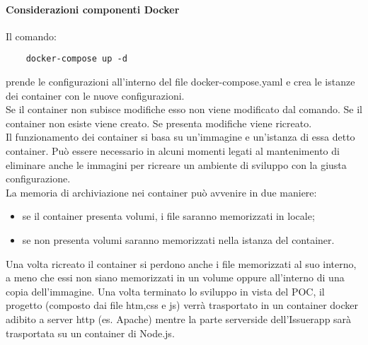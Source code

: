 \paragraph{Considerazioni componenti Docker}
Il comando:
\begin{verbatim}
    docker-compose up -d
\end{verbatim} 
prende le configurazioni all’interno del file docker-compose.yaml e crea le istanze dei container con le nuove configurazioni.\\
Se il container non subisce modifiche esso non viene modificato dal comando. Se il container non esiste viene creato. Se presenta modifiche viene ricreato.\\
Il funzionamento dei container si basa su un'immagine e un'istanza di essa detto container. Può essere necessario in alcuni momenti legati al mantenimento di eliminare anche le immagini per ricreare un ambiente di sviluppo con la giusta configurazione.\\
La memoria di archiviazione nei container può avvenire in due maniere:
\begin{itemize}
    \item se il container presenta volumi, i file saranno memorizzati in locale;
    \item se non presenta volumi saranno memorizzati nella istanza del container.
\end{itemize} 
Una volta ricreato il container si perdono anche i file memorizzati al suo interno, a meno che essi non siano memorizzati in un volume oppure all’interno di una copia dell’immagine.
Una volta terminato lo sviluppo in vista del POC, il progetto (composto dai file htm,css e js) verrà trasportato in un container docker adibito a server http (es. Apache) mentre la parte serverside dell'Issuerapp sarà trasportata su un container di Node.js.






